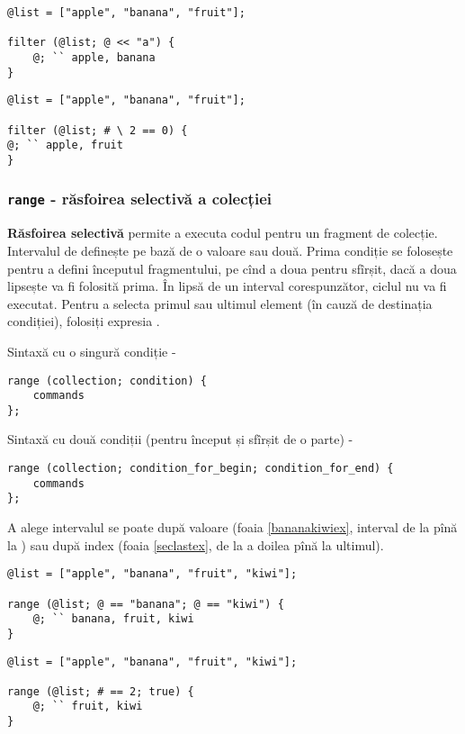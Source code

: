\begin{lstlisting}[caption=Filtrare pe bază de valoare, label=filterdataex]
@list = ["apple", "banana", "fruit"];

filter (@list; @ << "a") {
	@; `` apple, banana
}
\end{lstlisting}

\begin{lstlisting}[caption=Filtare după index, label=filterindexex]
@list = ["apple", "banana", "fruit"];

filter (@list; # \ 2 == 0) {
@; `` apple, fruit
}
\end{lstlisting}

\subsubsection{\lstinline`range` - răsfoirea selectivă a colecției}

{\bf Răsfoirea selectivă} permite a executa codul pentru un fragment de colecție. Intervalul de definește pe bază de o valoare sau două. Prima condiție se folosește pentru a defini începutul fragmentului, pe cînd a doua pentru sfîrșit, dacă a doua lipsește va fi folosită prima. În lipsă de un interval corespunzător, ciclul nu va fi executat. Pentru a selecta primul sau ultimul element (în cauză de destinația condiției), folosiți expresia \true{}.

Sintaxă cu o singură condiție -
\begin{lstlisting}[numbers=none]
range (collection; condition) {
	commands
};
\end{lstlisting}

Sintaxă cu două condiții (pentru început și sfîrșit de o parte) -
\begin{lstlisting}[numbers=none]
range (collection; condition_for_begin; condition_for_end) {
	commands
};
\end{lstlisting}

A alege intervalul se poate după valoare (foaia \ref{bananakiwiex}, interval de la  pînă la ) sau după index (foaia \ref{seclastex}, de la a doilea pînă la ultimul).

\begin{lstlisting}[caption=Interval: de la banana pîna la kiwi, label=bananakiwiex]
@list = ["apple", "banana", "fruit", "kiwi"];

range (@list; @ == "banana"; @ == "kiwi") {
	@; `` banana, fruit, kiwi
}
\end{lstlisting}

\begin{lstlisting}[caption=Interval: de la al doilea pînă la ultimul, label=seclastex]
@list = ["apple", "banana", "fruit", "kiwi"];

range (@list; # == 2; true) {
	@; `` fruit, kiwi
}
\end{lstlisting}

